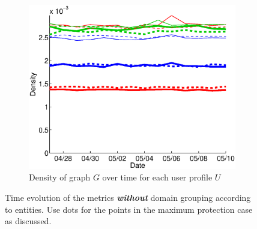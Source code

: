 \documentclass{sig-alternate}
\begin{document}
\begin{figure}
  \begin{subfigure}{.45\textwidth}
    \includegraphics[width=\textwidth]{figures/plots/density.eps}
    \caption{Density of graph $G$ over time for each user profile $U$}
    \label{fig:density}
  \end{subfigure}

  \caption{Time evolution of the metrics \textbf{\textit{without}} domain grouping according to entities. {\color{red}Use dots for the points in the maximum protection case as discussed.}}
  \label{fig:metrics_without_entities}
  \end{figure}
\end{document}
